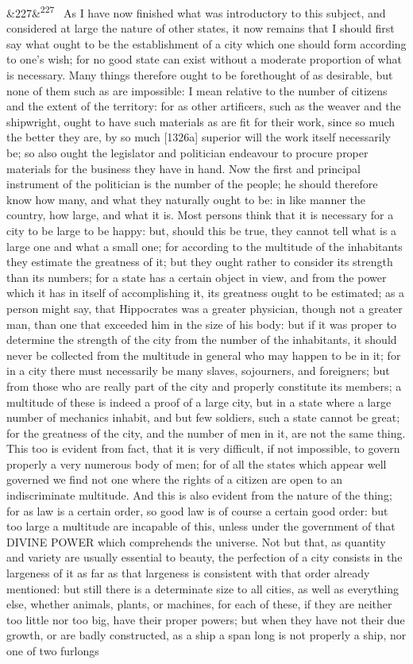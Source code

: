 \documentclass[12pt]{article}
\newcommand{\para}[1][]{\par\noindent\ifx&#1&\else\textsuperscript{\footnotesize #1}~\fi}
\begin{document}
\para[227] As I have now finished what was introductory to this subject, and considered at large the nature of other states, it now remains that I should first say what ought to be the establishment of a city which one should form according to one's wish; for no good state can exist without a moderate proportion of what is necessary. Many things therefore ought to be forethought of as desirable, but none of them such as are impossible: I mean relative to the number of citizens and the extent of the territory: for as other artificers, such as the weaver and the shipwright, ought to have such materials as are fit for their work, since so much the better they are, by so much [1326a] superior will the work itself necessarily be; so also ought the legislator and politician endeavour to procure proper materials for the business they have in hand. Now the first and principal instrument of the politician is the number of the people; he should therefore know how many, and what they naturally ought to be: in like manner the country, how large, and what it is. Most persons think that it is necessary for a city to be large to be happy: but, should this be true, they cannot tell what is a large one and what a small one; for according to the multitude of the inhabitants they estimate the greatness of it; but they ought rather to consider its strength than its numbers; for a state has a certain object in view, and from the power which it has in itself of accomplishing it, its greatness ought to be estimated; as a person might say, that Hippocrates was a greater physician, though not a greater man, than one that exceeded him in the size of his body: but if it was proper to determine the strength of the city from the number of the inhabitants, it should never be collected from the multitude in general who may happen to be in it; for in a city there must necessarily be many slaves, sojourners, and foreigners; but from those who are really part of the city and properly constitute its members; a multitude of these is indeed a proof of a large city, but in a state where a large number of mechanics inhabit, and but few soldiers, such a state cannot be great; for the greatness of the city, and the number of men in it, are not the same thing. This too is evident from fact, that it is very difficult, if not impossible, to govern properly a very numerous body of men; for of all the states which appear well governed we find not one where the rights of a citizen are open to an indiscriminate multitude. And this is also evident from the nature of the thing; for as law is a certain order, so good law is of course a certain good order: but too large a multitude are incapable of this, unless under the government of that DIVINE POWER which comprehends the universe. Not but that, as quantity and variety are usually essential to beauty, the perfection of a city consists in the largeness of it as far as that largeness is consistent with that order already mentioned: but still there is a determinate size to all cities, as well as everything else, whether animals, plants, or machines, for each of these, if they are neither too little nor too big, have their proper powers; but when they have not their due growth, or are badly constructed, as a ship a span long is not properly a ship, nor one of two furlongs 
\end{document}
